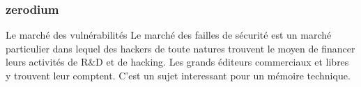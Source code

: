 \begin{frame}
\frametitle<presentation>{zerodium}
\end{frame}


\begin{warningbox}{Le marché des vulnérabilités}
Le marché des failles de sécurité est un marché particulier dans lequel des hackers de toute natures trouvent le moyen de financer leurs activités de R\&D et de hacking. Les grands éditeurs commerciaux et libres y trouvent leur comptent. C'est un sujet interessant pour un mémoire technique. 	
\end{warningbox}





